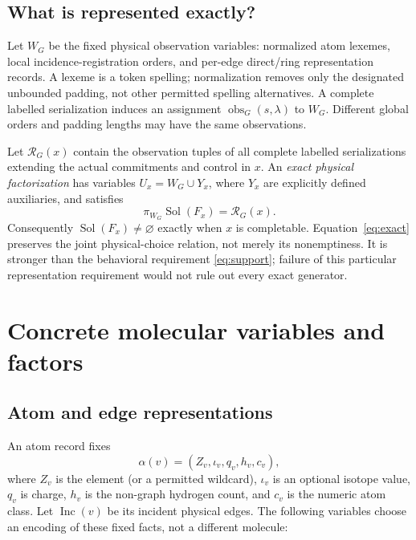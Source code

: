 \documentclass[11pt,a4paper]{article}
\newcommand{\Sol}{\operatorname{Sol}}
\newcommand{\obs}{\operatorname{obs}}
\newcommand{\Inc}{\operatorname{Inc}}
\newcommand{\R}{\mathcal R}
\begin{document}
\subsection{What is represented exactly?}
Let \(W_G\) be the fixed physical observation variables: normalized atom lexemes,
local incidence-registration orders, and per-edge direct/ring representation
records. A lexeme is a token spelling; normalization removes only the designated
unbounded padding, not other permitted spelling alternatives. A complete labelled
serialization induces an assignment \(\obs_G(s,\lambda)\) to \(W_G\). Different
global orders and padding lengths may have the same observations.\cite{note127}

Let \(\R_G(x)\) contain the observation tuples of all complete labelled
serializations extending the actual commitments and control in \(x\).
An \emph{exact physical factorization} has variables \(U_x=W_G\cup Y_x\), where
\(Y_x\) are explicitly defined auxiliaries, and satisfies
\begin{equation}\label{eq:exact}
 \boxed{\pi_{W_G}\Sol(F_x)=\R_G(x).}
\end{equation}
Consequently \(\Sol(F_x)\ne\varnothing\) exactly when \(x\) is completable.
Equation~\eqref{eq:exact} preserves the joint physical-choice relation, not merely
its nonemptiness. It is stronger than the behavioral requirement
\eqref{eq:support}; failure of this particular representation requirement would
not rule out every exact generator.\cite{note127}

\section{Concrete molecular variables and factors}
\subsection{Atom and edge representations}
An atom record fixes
\[
 \alpha(v)=(Z_v,\iota_v,q_v,h_v,c_v),
\]
where \(Z_v\) is the element (or a permitted wildcard), \(\iota_v\) is an optional
isotope value, \(q_v\) is charge, \(h_v\) is the non-graph hydrogen count, and
\(c_v\) is the numeric atom class. Let \(\Inc(v)\) be its incident physical edges.
The following variables choose an encoding of these fixed facts, not a different
molecule:
\end{document}
